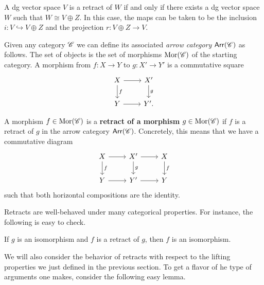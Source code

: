 \documentclass[11pt]{amsart}
\begin{document}
\begin{eg}
A dg vector space $V$ is a retract of $W$ if and only if there exists a dg vector space $W$ such that $W \cong V \oplus Z$.
In this case, the maps can be taken to be the inclusion $i : V \hookrightarrow V \oplus Z$ and the projection $r : V \oplus Z \to V$. 
\end{eg}

\def\Arr{{\sf Arr}}

Given any category $\mathscr C$ we can define its associated {\em arrow category} $\Arr(\sC)$ as follows. 
The set of objects is the set of morphisms ${\rm Mor}(\mathscr C)$ of the starting category. 
A morphism from $f : X \to Y$ to $g : X' \to Y'$ is a commutative square
\[
\begin{tikzcd}
X \ar[r] \ar[d,"f"] & X' \ar[d, "g"] \\
Y \ar[r] & Y' .
\end{tikzcd}
\]

\begin{dfn}
A morphism $f \in {\rm Mor}(\mathscr C)$ is a {\bf retract of a morphism} $g \in {\rm Mor}(\mathscr C)$ if $f$ is a retract of $g$ in the arrow category $\Arr(\sC)$. 
Concretely, this means that we have a commutative diagram
\[
\begin{tikzcd}
X \ar[r] \ar[d,"f"] & X' \ar[d, "g"] \ar[r] & X\ar[d, "f"] \\
Y \ar[r] & Y' \ar[r] & Y 
\end{tikzcd}
\]
such that both horizontal compositions are the identity. 
\end{dfn}

Retracts are well-behaved under many categorical properties.
For instance, the following is easy to check.

\begin{lem}
If $g$ is an isomorphism and $f$ is a retract of $g$, then $f$ is an isomorphism. 
\end{lem}

We will also consider the behavior of retracts with respect to the lifting properties we just defined in the previous section.  
To get a flavor of he type of arguments one makes, consider the following easy lemma.
 
\end{document}

